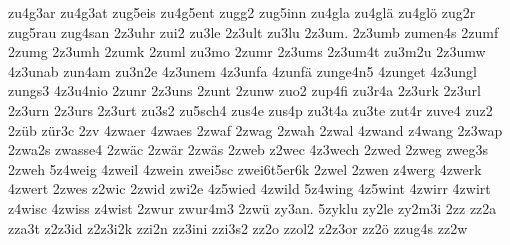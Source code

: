 {    zu4g3ar
    zu4g3at
    zug5eis
    zu4g5ent
    zugg2
    zug5inn
    zu4gla
    zu4glä
    zu4glö
    zug2r
    zug5rau
    zug4san
    2z3uhr
    zui2
    zu3le
    2z3ult
    zu3lu
    2z3um.
    2z3umb
    zumen4s
    2zumf
    2zumg
    2z3umh
    2zumk
    2zuml
    zu3mo
    2zumr
    2z3ums
    2z3um4t
    zu3m2u
    2z3umw
    4z3unab
    zun4am
    zu3n2e
    4z3unem
    4z3unfa
    4zunfä
    zunge4n5
    4zunget
    4z3ungl
    zungs3
    4z3u4nio
    2zunr
    2z3uns
    2zunt
    2zunw
    zuo2
    zup4fi
    zu3r4a
    2z3urk
    2z3url
    2z3urn
    2z3urs
    2z3urt
    zu3s2
    zu5sch4
    zus4e
    zus4p
    zu3t4a
    zu3te
    zut4r
    zuve4
    zuz2
    2züb
    zür3c
    2zv
    4zwaer
    4zwaes
    2zwaf
    2zwag
    2zwah
    2zwal
    4zwand
    z4wang
    2z3wap
    2zwa2s
    zwasse4
    2zwäc
    2zwär
    2zwäs
    2zweb
    z2wec
    4z3wech
    2zwed
    2zweg
    zweg3s
    2zweh
    5z4weig
    4zweil
    4zwein
    zwei5sc
    zwei6t5er6k
    2zwel
    2zwen
    z4werg
    4zwerk
    4zwert
    2zwes
    z2wic
    2zwid
    zwi2e
    4z5wied
    4zwild
    5z4wing
    4z5wint
    4zwirr
    4zwirt
    z4wisc
    4zwiss
    z4wist
    2zwur
    zwur4m3
    2zwü
    zy3an.
    5zyklu
    zy2le
    zy2m3i
    2zz
    zz2a
    zza3t
    z2z3id
    z2z3i2k
    zzi2n
    zz3ini
    zzi3s2
    zz2o
    zzol2
    z2z3or
    zz2ö
    zzug4s
    zz2w
}

\endinput

